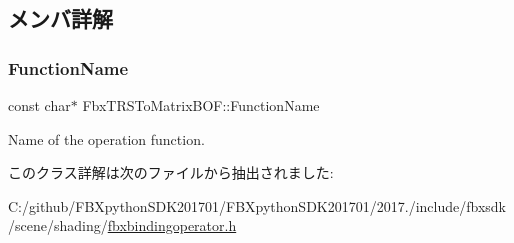 \subsection{メンバ詳解}
\mbox{\label{class_fbx_t_r_s_to_matrix_b_o_f_a91c277c5be0b7fef6081446541badd1a}} 
\subsubsection{\texorpdfstring{Function\+Name}{FunctionName}}
{\footnotesize\ttfamily const char$\ast$ Fbx\+T\+R\+S\+To\+Matrix\+B\+O\+F\+::\+Function\+Name\hspace{0.3cm}{\ttfamily [static]}}



Name of the operation function. 



このクラス詳解は次のファイルから抽出されました\+:\begin{DoxyCompactItemize}
\item 
C\+:/github/\+F\+B\+Xpython\+S\+D\+K201701/\+F\+B\+Xpython\+S\+D\+K201701/2017./include/fbxsdk/scene/shading/\hyperlink{fbxbindingoperator_8h}{fbxbindingoperator.\+h}\end{DoxyCompactItemize}
